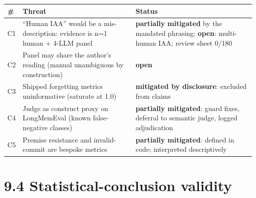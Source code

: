 {\def\LTcaptype{none} %
\begin{longtable}[]{@{}
  >{\raggedright\arraybackslash}p{}
  >{\raggedright\arraybackslash}p{}
  >{\raggedright\arraybackslash}p{}@{}}
\toprule\noalign{}
\begin{minipage}[b]{\linewidth}\raggedright
\#
\end{minipage} & \begin{minipage}[b]{\linewidth}\raggedright
Threat
\end{minipage} & \begin{minipage}[b]{\linewidth}\raggedright
Status
\end{minipage} \\
\midrule\noalign{}
\endhead
\bottomrule\noalign{}
\endlastfoot
C1 & ``Human IAA'' would be a mis-description: evidence is n=1 human +
4-LLM panel & \textbf{partially mitigated} by the mandated phrasing;
\textbf{open}: multi-human IAA; review sheet 0/180 \\
C2 & Panel may share the author's reading (manual unambiguous by
construction) & \textbf{open} \\
C3 & Shipped forgetting metrics uninformative (saturate at 1.0) &
\textbf{mitigated by disclosure}: excluded from claims \\
C4 & Judge as construct proxy on LongMemEval (known false-negative
classes) & \textbf{partially mitigated}: guard fixes, deferral to
semantic judge, logged adjudication \\
C5 & Premise resistance and invalid-commit are bespoke metrics &
\textbf{partially mitigated}: defined in code; interpreted
descriptively \\
\end{longtable}
}

\section{9.4 Statistical-conclusion
validity}\label{statistical-conclusion-validity}

